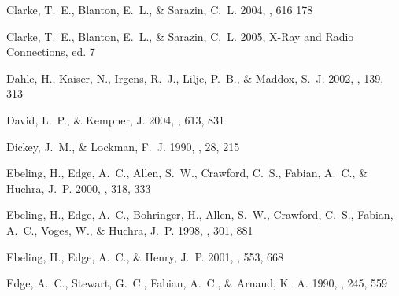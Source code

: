 \documentclass[apj]{emulateapj}
\begin{document}
\begin{thebibliography}{}
{Clarke}, T.~E., {Blanton}, E.~L., \& {Sarazin}, C.~L. 2004, \apj,
  616 178

{Clarke}, T.~E., {Blanton}, E.~L., \& {Sarazin}, C.~L. 2005, X-Ray
  and Radio Connections, ed. 7

{Dahle}, H., {Kaiser}, N., {Irgens}, R.~J., {Lilje}, P.~B., \& {Maddox}, S.~J.
  2002, \apjs, 139, 313

{David}, L.~P., \& {Kempner}, J. 2004, \apj, 613, 831

{Dickey}, J.~M., \& {Lockman}, F.~J. 1990, \araa, 28, 215

{Ebeling}, H., {Edge}, A.~C., {Allen}, S.~W., {Crawford}, C.~S., {Fabian},
  A.~C., \& {Huchra}, J.~P. 2000, \mnras, 318, 333

{Ebeling}, H., {Edge}, A.~C., {Bohringer}, H., {Allen}, S.~W., {Crawford},
  C.~S., {Fabian}, A.~C., {Voges}, W., \& {Huchra}, J.~P. 1998, \mnras, 301,
  881

{Ebeling}, H., {Edge}, A.~C., \& {Henry}, J.~P. 2001, \apj, 553, 668

{Edge}, A.~C., {Stewart}, G.~C., {Fabian}, A.~C., \& {Arnaud}, K.~A. 1990,
  \mnras, 245, 559


\end{thebibliography}
\end{document}
